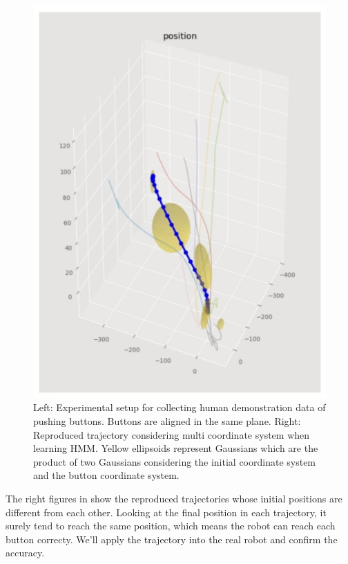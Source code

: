 \begin{figure}[htbp]
\begin{minipage}{0.60\hsize}
\begin{center}
\begin{minipage}{0.45\hsize}
\begin{center}
          \includegraphics[clip,width=\hsize]{./figs/push_button_repro4.png}
        \end{center}
      \end{minipage}
    \end{center}
  \end{minipage}
  \caption{Left: Experimental setup for collecting human demonstration data of pushing buttons. Buttons are aligned in the same plane. Right: Reproduced trajectory considering multi coordinate system when learning HMM. Yellow ellipsoids represent Gaussians which are the product of two Gaussians considering the initial coordinate system and the button coordinate system.}
  \label{figure:push_button}
\end{figure}

The right figures in  show the reproduced trajectories whose initial positions are different from each other. Looking at the final position in each trajectory, it surely tend to reach the same position, which means the robot can reach each button correcty. We'll apply the trajectory into the real robot and confirm the accuracy.
